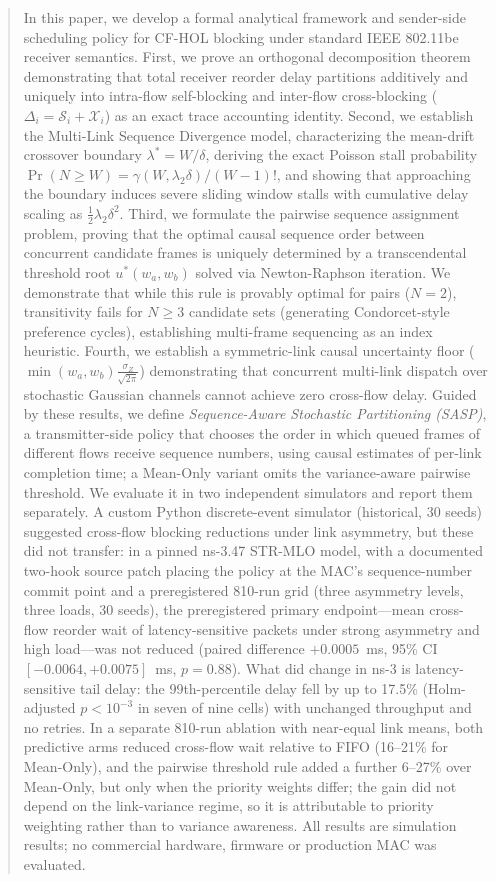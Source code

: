 \documentclass[10pt,journal,compsoc]{IEEEtran}
\begin{document}
{\begin{abstract}
In this paper, we develop a formal analytical framework and sender-side scheduling policy for CF-HOL blocking under standard IEEE 802.11be receiver semantics. First, we prove an orthogonal decomposition theorem demonstrating that total receiver reorder delay partitions additively and uniquely into intra-flow self-blocking and inter-flow cross-blocking ($\Delta_i = \mathcal{S}_i + \mathcal{X}_i$) as an exact trace accounting identity. Second, we establish the Multi-Link Sequence Divergence model, characterizing the mean-drift crossover boundary $\lambda^* = W / \delta$, deriving the exact Poisson stall probability $\Pr(N \ge W) = \gamma(W, \lambda_2 \delta) / (W-1)!$, and showing that approaching the boundary induces severe sliding window stalls with cumulative delay scaling as $\frac{1}{2} \lambda_2 \delta^2$. Third, we formulate the pairwise sequence assignment problem, proving that the optimal causal sequence order between concurrent candidate frames is uniquely determined by a transcendental threshold root $u^*(w_a, w_b)$ solved via Newton-Raphson iteration. We demonstrate that while this rule is provably optimal for pairs ($N=2$), transitivity fails for $N \ge 3$ candidate sets (generating Condorcet-style preference cycles), establishing multi-frame sequencing as an index heuristic. Fourth, we establish a symmetric-link causal uncertainty floor ($\min(w_a, w_b) \frac{\sigma_Z}{\sqrt{2\pi}}$) demonstrating that concurrent multi-link dispatch over stochastic Gaussian channels cannot achieve zero cross-flow delay. Guided by these results, we define \emph{Sequence-Aware Stochastic Partitioning (SASP)}, a transmitter-side policy that chooses the order in which queued frames of different flows receive sequence numbers, using causal estimates of per-link completion time; a Mean-Only variant omits the variance-aware pairwise threshold. We evaluate it in two independent simulators and report them separately. A custom Python discrete-event simulator (historical, 30 seeds) suggested cross-flow blocking reductions under link asymmetry, but these did not transfer: in a pinned ns-3.47 STR-MLO model, with a documented two-hook source patch placing the policy at the MAC's sequence-number commit point and a preregistered 810-run grid (three asymmetry levels, three loads, 30 seeds), the preregistered primary endpoint---mean cross-flow reorder wait of latency-sensitive packets under strong asymmetry and high load---was not reduced (paired difference $+0.0005$~ms, 95\% CI $[-0.0064,+0.0075]$~ms, $p=0.88$). What did change in ns-3 is latency-sensitive tail delay: the 99th-percentile delay fell by up to 17.5\% (Holm-adjusted $p<10^{-3}$ in seven of nine cells) with unchanged throughput and no retries. In a separate 810-run ablation with near-equal link means, both predictive arms reduced cross-flow wait relative to FIFO (16--21\% for Mean-Only), and the pairwise threshold rule added a further 6--27\% over Mean-Only, but only when the priority weights differ; the gain did not depend on the link-variance regime, so it is attributable to priority weighting rather than to variance awareness. All results are simulation results; no commercial hardware, firmware or production MAC was evaluated.


\end{abstract}}
\end{document}
